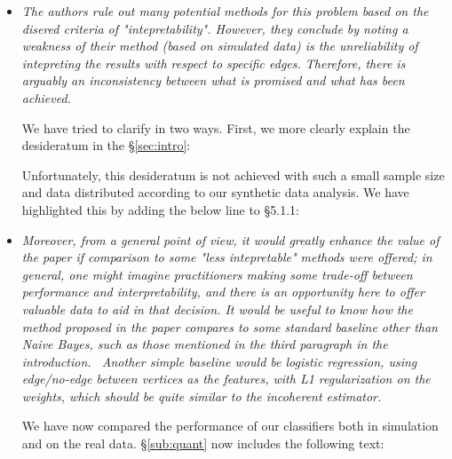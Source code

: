 \begin{itemize}
	\item \emph{The authors rule out many potential methods for this problem based on the disered criteria of "intepretability". However, they conclude by noting a weakness of their method (based on simulated data) is the unreliability of intepreting the results with respect to specific edges. Therefore, there is arguably an inconsistency between what is promised and what has been achieved.}
			
	We have tried to clarify in two ways.  First, we more clearly explain the desideratum in the \S \ref{sec:intro}:
	
	
	Unfortunately, this desideratum is not achieved with such a small sample size and data distributed according to our synthetic data analysis.  We have highlighted this by adding the below line to \S 5.1.1:
		



	\item \emph{Moreover, from a general point of view, it would greatly enhance the value of the paper if comparison to some "less intepretable" methods were offered; in general, one might imagine practitioners making some trade-off between performance and interpretability, and there is an opportunity here to offer valuable data to aid in that decision. It would be useful to know how the method proposed in the paper compares to some standard baseline other than Naive Bayes, such as those mentioned in the third paragraph in the introduction.  Another simple baseline would be logistic regression, using edge/no-edge between vertices as the features, with L1 regularization on the weights, which should be quite similar to the incoherent estimator.}
	
	We have now compared the performance of our classifiers both in simulation and on the real data.  \S \ref{sub:quant} now includes the following text:
	

\end{itemize}
